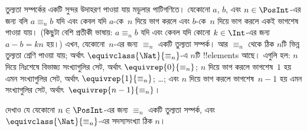 \documentclass[../../../include/open-logic-section]{subfiles}
\begin{document}
\begin{ex}
তুল্যতা সম্পর্কের একটি সুন্দর উদাহরণ পাওয়া যায় মডুলার পাটিগণিতে। যেকোনো $a$, $b$, এবং $n \in \PosInt$-এর জন্য বলি $a \equiv_n b$ যদি এবং কেবল যদি $a$-কে~$n$ দিয়ে ভাগ করলে এবং $b$-কে~$n$ দিয়ে ভাগ করলে একই ভাগশেষ পাওয়া যায়। (কিছুটা বেশি প্রতীকী ভাষায়: $a \equiv_n b$ যদি এবং কেবল যদি কোনো $k \in \Int$-এর জন্য $a - b = kn$ হয়।) এখন, যেকোনো~$n$-এর জন্য $\equiv_n$ একটি তুল্যতা সম্পর্ক। আর $\equiv_n$ থেকে ঠিক $n$টি ভিন্ন তুল্যতা শ্রেণি পাওয়া যায়; অর্থাৎ $\equivclass{\Nat}{\equiv_n}$-এ $n$টি !!{element}s আছে। এগুলি হল: $n$ দিয়ে নিঃশেষে বিভাজ্য সংখ্যাগুলির সেট, অর্থাৎ $\equivrep{0}{\equiv_n}$; $n$ দিয়ে ভাগ করলে ভাগশেষ~$1$ হয় এমন সংখ্যাগুলির সেট, অর্থাৎ $\equivrep{1}{\equiv_n}$; \ldots; এবং $n$ দিয়ে ভাগ করলে ভাগশেষ~$n-1$ হয় এমন সংখ্যাগুলির সেট, অর্থাৎ~$\equivrep{n-1}{\equiv_n}$।
\end{ex}

\begin{prob}
দেখাও যে যেকোনো $n \in \PosInt$-এর জন্য $\equiv_n$ একটি তুল্যতা সম্পর্ক, এবং $\equivclass{\Nat}{\equiv_n}$-এর সদস্যসংখ্যা ঠিক $n$।
\end{prob}
\end{document}
